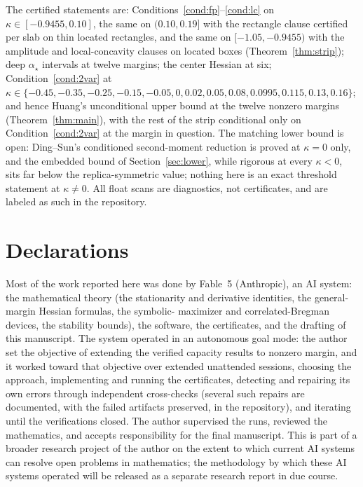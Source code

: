 \documentclass[11pt]{article}
\theoremstyle{remark}
\begin{document}
The certified statements are: Conditions~\ref{cond:fp}--\ref{cond:lc}
on $\kappa\in[-0.9455,0.10]$, the same on
$(0.10,0.19]$ with the rectangle clause certified per slab on thin
located rectangles, and the same on $[-1.05,-0.9455)$ with the
amplitude and local-concavity clauses on located boxes
(Theorem~\ref{thm:strip}); deep
$\alpha_\star$ intervals at twelve margins; the center Hessian at six;
Condition~\ref{cond:2var} at
$\kappa\in\{-0.45,-0.35,-0.25,-0.15,-0.05,0,0.02,0.05,
0.08,0.0995,0.115,0.13,0.16\}$; and hence Huang's
unconditional upper bound at the twelve nonzero margins
(Theorem~\ref{thm:main}), with the rest of the strip conditional
only on Condition~\ref{cond:2var} at the margin in question.  The matching lower
bound is open: Ding--Sun's conditioned second-moment reduction
is proved at $\kappa=0$ only, and the embedded bound of
Section~\ref{sec:lower}, while rigorous at every $\kappa<0$, sits
far below the replica-symmetric value; nothing here is an exact
threshold statement at $\kappa\ne0$.  All float scans are diagnostics, not
certificates, and are labeled as such in the repository.

\section*{Declarations}
Most of the work reported here was done by Fable~5 (Anthropic), an AI
system: the mathematical theory (the stationarity and derivative
identities, the general-margin Hessian formulas, the symbolic-
maximizer and correlated-Bregman devices, the stability bounds), the
software, the certificates, and the drafting of this manuscript.  The
system operated in an autonomous goal mode: the author set the
objective of extending the verified capacity results to nonzero
margin, and it worked toward that objective over extended unattended
sessions, choosing the approach, implementing and running the
certificates, detecting and repairing its own errors through
independent cross-checks (several such repairs are documented, with
the failed artifacts preserved, in the repository), and iterating
until the verifications closed.  The author supervised the runs,
reviewed the mathematics, and accepts responsibility for the final
manuscript.  This is part of a broader research project of the
author on the extent to which current AI systems can resolve open
problems in mathematics; the methodology by which these AI systems
operated will be released as a separate research report in due
course.
\end{document}
